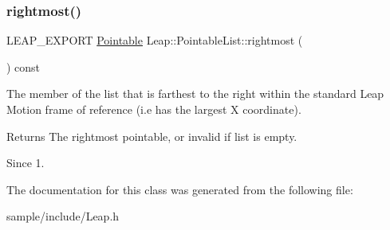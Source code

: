 \subsubsection{\texorpdfstring{rightmost()}{rightmost()}}
{\footnotesize\ttfamily L\+E\+A\+P\+\_\+\+E\+X\+P\+O\+RT \hyperlink{class_leap_1_1_pointable}{Pointable} Leap\+::\+Pointable\+List\+::rightmost (\begin{DoxyParamCaption}{ }\end{DoxyParamCaption}) const}

The member of the list that is farthest to the right within the standard Leap Motion frame of reference (i.\+e has the largest X coordinate).


\begin{DoxyCodeInclude}
\end{DoxyCodeInclude}


\begin{DoxyReturn}{Returns}
The rightmost pointable, or invalid if list is empty. 
\end{DoxyReturn}
\begin{DoxySince}{Since}
1. 
\end{DoxySince}


The documentation for this class was generated from the following file\+:\begin{DoxyCompactItemize}
\item 
sample/include/Leap.\+h\end{DoxyCompactItemize}
